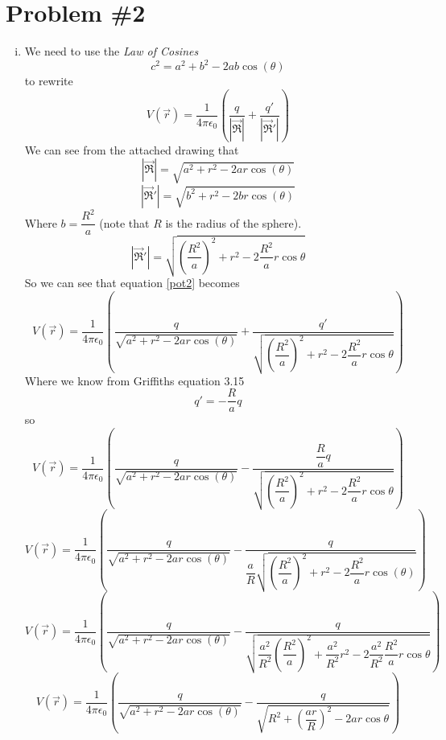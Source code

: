 \documentclass[11pt]{article}
\numberwithin{equation}{section}
\newcommand{\scrptR}{\vec{\mathfrak{R}}}
\begin{document}
\section{Problem \#2}
\begin{enumerate}[(i)]
\item
We need to use the \emph{Law of Cosines}
$$c^2 = a^2+b^2-2ab\cos(\theta)$$
to rewrite 
\begin{equation}
V(\vec{r}) = \frac{1}{4\pi\epsilon_0}\left(\frac{q}{|\scrptR|}+\frac{q'}{|\scrptR'|}\right)
\label{pot2}
\end{equation}
We can see from the attached drawing that
$$|\scrptR|=\sqrt{a^2+r^2-2ar\cos(\theta)}$$
$$|\scrptR'|=\sqrt{b^2+r^2-2br\cos(\theta)}$$
Where $b=\dfrac{R^2}{a}$ (note that $R$ is the radius of the sphere).
$$|\scrptR'|=\sqrt{\left(\frac{R^2}{a}\right)^2+r^2-2\frac{R^2}{a}r\cos{\theta}}$$
So we can see that equation \ref{pot2} becomes 
$$V(\vec{r}) = \frac{1}{4\pi\epsilon_0}\left(\frac{q}{\sqrt{a^2+r^2-2ar\cos(\theta)}}+\frac{q'}{\sqrt{\left(\dfrac{R^2}{a}\right)^2+r^2-2\dfrac{R^2}{a}r\cos{\theta}}}\right)$$
Where we know from Griffiths equation 3.15
$$q'=-\frac{R}{a}q$$
so
$$V(\vec{r}) = \frac{1}{4\pi\epsilon_0}\left(\frac{q}{\sqrt{a^2+r^2-2ar\cos(\theta)}}-\frac{\dfrac{R}{a}q}{\sqrt{\left(\dfrac{R^2}{a}\right)^2+r^2-2\dfrac{R^2}{a}r\cos{\theta}}}\right)$$
$$V(\vec{r}) = \frac{1}{4\pi\epsilon_0}\left(\frac{q}{\sqrt{a^2+r^2-2ar\cos(\theta)}}-\frac{q}{\dfrac{a}{R}\sqrt{\left(\dfrac{R^2}{a}\right)^2+r^2-2\dfrac{R^2}{a}r\cos(\theta)}}\right)$$
$$V(\vec{r}) = \frac{1}{4\pi\epsilon_0}\left(\frac{q}{\sqrt{a^2+r^2-2ar\cos(\theta)}}-\frac{q}{\sqrt{\dfrac{a^2}{R^2}\left(\dfrac{R^2}{a}\right)^2+\dfrac{a^2}{R^2}r^2-2\dfrac{a^2}{R^2}\dfrac{R^2}{a}r\cos{\theta}}}\right)$$
$$V(\vec{r}) = \frac{1}{4\pi\epsilon_0}\left(\frac{q}{\sqrt{a^2+r^2-2ar\cos(\theta)}}-\frac{q}{\sqrt{R^2+\left(\dfrac{ar}{R}\right)^2-2ar\cos{\theta}}}\right)$$


\end{enumerate}
\end{document}
